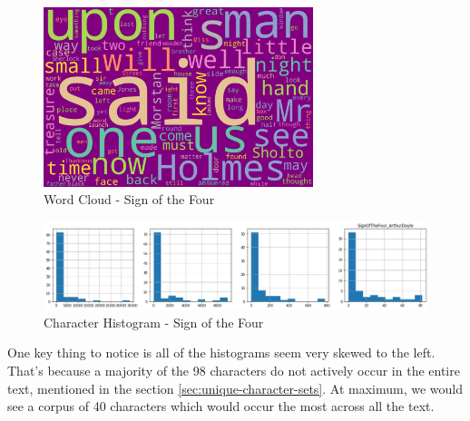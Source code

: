 \begin{figure}[H]
	\begin{center}
		\includegraphics[width = 0.7\textwidth]{Images/SignOfTheFour_ArthurDoyle.jpeg} %
		\caption{Word Cloud - Sign of the Four}
		\label{fig:sign-of-the-four}
	\end{center}
\end{figure}

\begin{figure}[H]
	\begin{center}
		\includegraphics[width = 1.0\textwidth]{Images/char_hist_SignOfTheFour_ArthurDoyle.jpeg} %
		\caption{Character Histogram - Sign of the Four}
		\label{fig:histogram-signofthefour}
	\end{center}
\end{figure}

One key thing to notice is all of the histograms seem very skewed to the left. That's because a majority of the 98 characters do not actively occur in the entire text, mentioned in the section \ref{sec:unique-character-sets}. At maximum, we would see a corpus of 40 characters which would occur the most across all the text.

